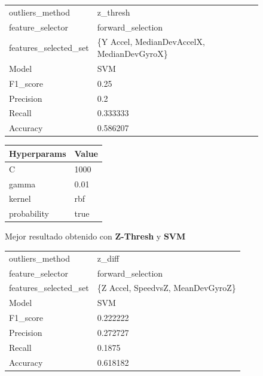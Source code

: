 \begin{appendices}
		\begin{figure}[htb]
			\centering
			\begin{tabular}{ll}
				\toprule
					  outliers\_method &                                   z\_thresh \\
					 feature\_selector &                          forward\_selection \\
				features\_selected\_set & \{Y Accel, MedianDevAccelX, MedianDevGyroX\} \\
								Model &                                        SVM \\
						F1\_score &                                       0.25 \\
					   Precision &                                        0.2 \\
						  Recall &                                   0.333333 \\
						Accuracy &                                   0.586207 \\
				\bottomrule
			\end{tabular}
			\newline
			\newline

			\begin{tabular}{ll}
				\toprule
				Hyperparams & Value \\
				\midrule
						  C &  1000 \\
					  gamma &  0.01 \\
					 kernel &   rbf \\
				probability &  true \\
				\bottomrule
			\end{tabular}
			\caption{Mejor resultado obtenido con \textbf{Z-Thresh} y \textbf{SVM}}
			\label{table:22}
		\end{figure}

		\begin{figure}[htb]
			\centering
			\begin{tabular}{ll}
				\toprule
					  outliers\_method &                            z\_diff \\
					 feature\_selector &                 forward\_selection \\
				features\_selected\_set & \{Z Accel, SpeedvsZ, MeanDevGyroZ\} \\
								Model &                               SVM \\
						F1\_score &                          0.222222 \\
					   Precision &                          0.272727 \\
						  Recall &                            0.1875 \\
						Accuracy &                          0.618182 \\
				\bottomrule
			\end{tabular}
			\newline
			\newline


\end{figure}
\end{appendices}
